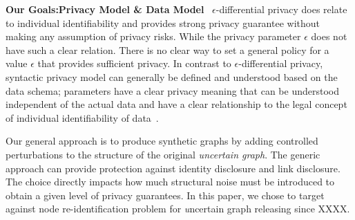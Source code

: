 \textbf{Our Goals:Privacy Model \& Data Model}~
$\epsilon$-differential privacy does relate to individual identifiability and provides strong privacy guarantee without making any assumption of privacy risks. While the privacy parameter $\epsilon$ does not have such a clear relation. There is no clear way to set a general policy for a value $\epsilon$ that provides sufficient privacy. In contrast to $\epsilon$-differential privacy, syntactic privacy model can generally be defined and understood based on the data schema; parameters have a clear privacy meaning that can be understood independent of the actual data and have a clear relationship to the legal concept of individual identifiability of data~\cite{}.  

Our general approach is to produce synthetic graphs by adding controlled perturbations to the structure of the original \emph{uncertain graph}. The generic approach can provide protection against identity disclosure and link disclosure. The choice directly impacts how much structural noise must be introduced to obtain a given level of privacy guarantees. In this paper, we chose to target against node re-identification problem for {\emph uncertain graph} releasing since XXXX. 